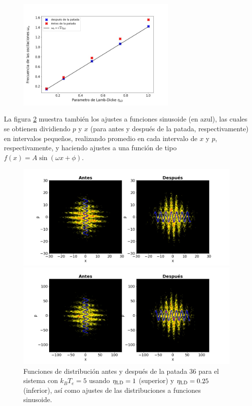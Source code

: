 \documentclass[letterpaper,12pt,oneside]{book}
\begin{document}
\begin{figure}
	\centering
	\label{fig.FrecuenciaOscilacionesWo}
	\includegraphics[width=0.7\textwidth
	]{FigsJPG/frecuencias_wk}
\end{figure}

La figura \ref{fig.CambioEtaAjustesSeno} muestra tambi\'en los ajustes a funciones sinusoide (en azul), las cuales se obtienen dividiendo $p$ y $x$ (para antes y despu\'es de la patada, respectivamente) en intervalos pequeños, realizando promedio en cada intervalo de $x$ y $p$, respectivamente, y haciendo ajustes a una funci\'on de tipo $f(x) = A\sin(\omega x + \phi)$.

\begin{figure}[h!]
	\centering
	\begin{minipage}{0.9\textwidth}
		\includegraphics[width=1\textwidth]{FigsJPG/dist_function_eta_1-00}
	\end{minipage}
	\begin{minipage}{0.9\textwidth}
		\includegraphics[width=1\textwidth]{FigsJPG/dist_function_eta_0-25}
	\end{minipage}
	\caption{Funciones de distribuci\'on antes y despu\'es de la patada 36 para el sistema con $k_BT_e=5$ usando $\eta_{\rm LD}=1$ (superior) y $\eta_{\rm LD}=0.25$ (inferior), as\'i como ajustes de las distribuciones a funciones sinusoide.}
	\label{fig.CambioEtaAjustesSeno}
\end{figure}
\end{document}
